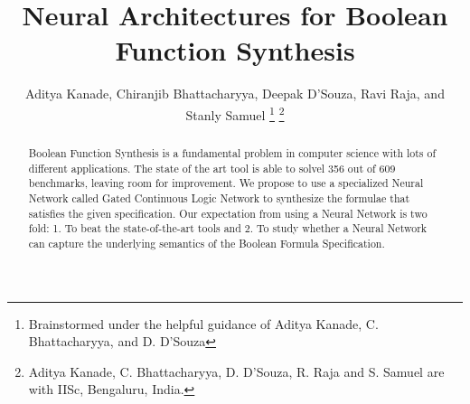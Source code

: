 \documentclass[letterpaper, 10 pt, conference]{ieeeconf} %
\title{%
Neural Architectures for Boolean Function Synthesis
}
\author{
Aditya Kanade,
Chiranjib Bhattacharyya,
Deepak D'Souza,
Ravi Raja, and
Stanly Samuel
%
%
\thanks{
Brainstormed under the helpful guidance of 
Aditya Kanade,	
C. Bhattacharyya, and
D. D'Souza
}
\thanks{
  Aditya Kanade,
	C. Bhattacharyya,
D. D'Souza,
R. Raja and
S. Samuel are with IISc, Bengaluru, India.
}
}
\begin{document}
\maketitle


\begin{abstract}
Boolean Function Synthesis is a fundamental problem in computer science with lots of different applications. The state of the art tool is able to solvel 356 out of 609 benchmarks, leaving room for improvement. We propose to use a specialized Neural Network called Gated Continuous Logic Network to synthesize the formulae that satisfies the given specification. Our expectation from using a Neural Network is two fold: 1. To beat the state-of-the-art tools and 2. To study whether a Neural Network can capture the underlying semantics of the Boolean Formula Specification.

\end{abstract}	





% 






% 

% 
 


% 

% 
\newpage





%
\end{document}
